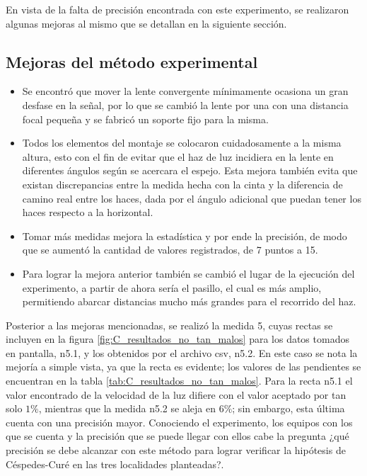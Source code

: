 En vista de la falta de precisión encontrada con este experimento, se realizaron algunas mejoras al mismo que se detallan en la siguiente sección.

\subsection{Mejoras del método experimental}

\begin{itemize}
    \item Se encontró que mover la lente convergente mínimamente ocasiona un gran desfase en la señal, por lo que se cambió la lente por una con una distancia focal pequeña y se fabricó un soporte fijo para la misma.
    \item Todos los elementos del montaje se colocaron cuidadosamente a la misma altura, esto con el fin de evitar que el haz de luz incidiera en la lente en diferentes ángulos según se acercara el espejo. Esta mejora también evita que existan discrepancias entre la medida hecha con la cinta y la diferencia de camino real entre los haces, dada por el ángulo adicional que puedan tener los haces respecto a la horizontal.
    \item Tomar más medidas mejora la estadística y por ende la precisión, de modo que se aumentó la cantidad de valores registrados, de 7 puntos a 15.
    \item Para lograr la mejora anterior también se cambió el lugar de la ejecución del experimento, a partir de ahora sería el pasillo, el cual es más amplio, permitiendo abarcar distancias mucho más grandes para el recorrido del haz.
\end{itemize}

Posterior a las mejoras mencionadas, se realizó la medida 5, cuyas rectas se incluyen en la figura \ref{fig:C_resultados_no_tan_malos} para los datos tomados en pantalla, n5.1, y los obtenidos por el archivo csv, n5.2.  En este caso se nota la mejoría a simple vista, ya que la recta es evidente; los valores de las pendientes se encuentran en la tabla \ref{tab:C_resultados_no_tan_malos}. Para la recta n5.1 el valor encontrado de la velocidad de la luz difiere con el valor aceptado por tan solo $1\%$, mientras que la medida n5.2 se aleja en $6\%$; sin embargo, esta última cuenta con una precisión mayor. Conociendo el experimento, los equipos con los que se cuenta y la precisión que se puede llegar con ellos cabe la pregunta ¿qué precisión se debe alcanzar con este método para lograr verificar la hipótesis de Céspedes-Curé en las tres localidades planteadas?.


